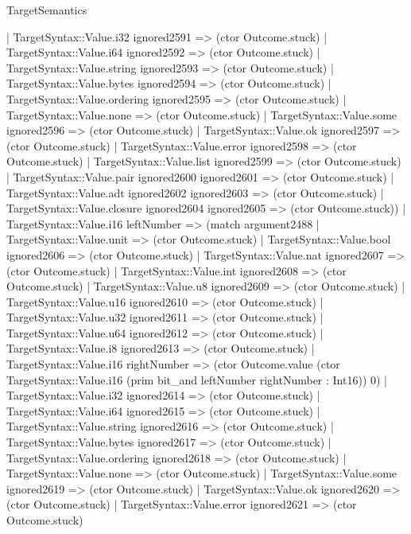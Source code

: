 \begin{lexlean}{TargetSemantics}
\begin{semanticmodule}
{              | TargetSyntax::Value.i32 ignored2591 => (ctor Outcome.stuck)
              | TargetSyntax::Value.i64 ignored2592 => (ctor Outcome.stuck)
              | TargetSyntax::Value.string ignored2593 => (ctor Outcome.stuck)
              | TargetSyntax::Value.bytes ignored2594 => (ctor Outcome.stuck)
              | TargetSyntax::Value.ordering ignored2595 => (ctor Outcome.stuck)
              | TargetSyntax::Value.none => (ctor Outcome.stuck)
              | TargetSyntax::Value.some ignored2596 => (ctor Outcome.stuck)
              | TargetSyntax::Value.ok ignored2597 => (ctor Outcome.stuck)
              | TargetSyntax::Value.error ignored2598 => (ctor Outcome.stuck)
              | TargetSyntax::Value.list ignored2599 => (ctor Outcome.stuck)
              | TargetSyntax::Value.pair ignored2600 ignored2601 => (ctor Outcome.stuck)
              | TargetSyntax::Value.adt ignored2602 ignored2603 => (ctor Outcome.stuck)
              | TargetSyntax::Value.closure ignored2604 ignored2605 => (ctor Outcome.stuck))
            | TargetSyntax::Value.i16 leftNumber => (match argument2488
              | TargetSyntax::Value.unit => (ctor Outcome.stuck)
              | TargetSyntax::Value.bool ignored2606 => (ctor Outcome.stuck)
              | TargetSyntax::Value.nat ignored2607 => (ctor Outcome.stuck)
              | TargetSyntax::Value.int ignored2608 => (ctor Outcome.stuck)
              | TargetSyntax::Value.u8 ignored2609 => (ctor Outcome.stuck)
              | TargetSyntax::Value.u16 ignored2610 => (ctor Outcome.stuck)
              | TargetSyntax::Value.u32 ignored2611 => (ctor Outcome.stuck)
              | TargetSyntax::Value.u64 ignored2612 => (ctor Outcome.stuck)
              | TargetSyntax::Value.i8 ignored2613 => (ctor Outcome.stuck)
              | TargetSyntax::Value.i16 rightNumber => (ctor Outcome.value (ctor TargetSyntax::Value.i16 (prim bit_and leftNumber rightNumber : Int16)) 0)
              | TargetSyntax::Value.i32 ignored2614 => (ctor Outcome.stuck)
              | TargetSyntax::Value.i64 ignored2615 => (ctor Outcome.stuck)
              | TargetSyntax::Value.string ignored2616 => (ctor Outcome.stuck)
              | TargetSyntax::Value.bytes ignored2617 => (ctor Outcome.stuck)
              | TargetSyntax::Value.ordering ignored2618 => (ctor Outcome.stuck)
              | TargetSyntax::Value.none => (ctor Outcome.stuck)
              | TargetSyntax::Value.some ignored2619 => (ctor Outcome.stuck)
              | TargetSyntax::Value.ok ignored2620 => (ctor Outcome.stuck)
              | TargetSyntax::Value.error ignored2621 => (ctor Outcome.stuck)
}
\end{semanticmodule}
\end{lexlean}
